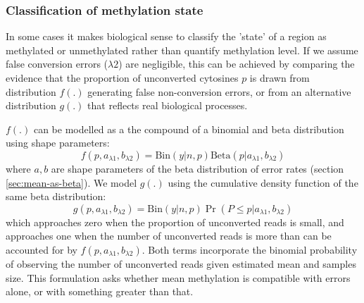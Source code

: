 \documentclass[12pt,longbibliography]{article}
\begin{document}

\subsubsection{Classification of methylation state} \label{sec:meth-state}

In some cases it makes biological sense to classify the 'state' of a region as methylated or unmethylated rather than quantify methylation level.
If we assume false conversion errors ($\lambda2$) are negligible, this can be achieved by comparing the evidence that the proportion of unconverted cytosines $p$ is drawn from distribution $f(.)$ generating false non-conversion errors, or from an alternative distribution $g(.)$ that reflects real biological processes.

$f(.)$ can be modelled as a the compound of a binomial and beta distribution using shape parameters:
\begin{equation}
    f(p,a_{\lambda1}, b_{\lambda2}) = 
    \textrm{Bin}(y|n,p)
    \textrm{Beta}(p | a_{\lambda1}, b_{\lambda2})
\end{equation}
where $a, b$ are shape parameters of the beta distribution of error rates (section \ref{sec:mean-as-beta}).
We model $g(.)$ using the cumulative density function of the same beta distribution:
\begin{equation}
    g(p,a_{\lambda1}, b_{\lambda2}) = 
    \textrm{Bin}(y|n,p)
    \Pr( P \leq p | a_{\lambda1}, b_{\lambda2})
\end{equation}
which approaches zero when the proportion of unconverted reads is small, and approaches one when the number of unconverted reads is more than can be accounted for by $ f(p,a_{\lambda1}, b_{\lambda2}) $.
Both terms incorporate the binomial probability of observing the number of unconverted reads given estimated mean and samples size.
This formulation asks whether mean methylation is compatible with errors alone, or with something greater than that.
\end{document}
